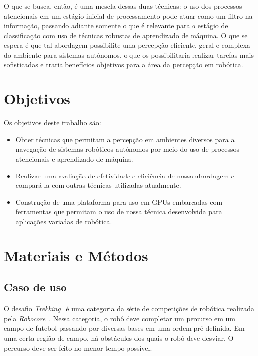 \documentclass[8pt]{article}
\newcommand{\tit}[1]{\textit{#1}}
\begin{document}
\begin{multicols}{2}
O que se busca, então, é uma mescla dessas duas técnicas: o uso dos processos
atencionais em um estágio inicial de processamento pode atuar como um filtro
na informação, passando adiante somente o que é relevante para o estágio de
classificação com uso de técnicas robustas de aprendizado de máquina. 
O que se espera é que tal abordagem possibilite uma percepção eficiente, geral
e complexa do ambiente para sistemas autônomos, o que os possibilitaria 
realizar tarefas mais sofisticadas e traria benefícios objetivos para
a área da percepção em robótica.

\section{Objetivos}
\paragraph{}
Os objetivos deste trabalho são:
\begin{itemize}
	\item Obter técnicas que permitam a percepção em ambientes
		diversos para a navegação de sistemas robóticos autônomos por meio 
		do uso de processos atencionais e aprendizado de máquina.
	\item Realizar uma avaliação de efetividade e eficiência de nossa abordagem
		e compará-la com outras técnicas utilizadas atualmente.
	\item Construção de uma plataforma para uso em GPUs embarcadas com 
		ferramentas que permitam o uso de nossa técnica desenvolvida para
		aplicações variadas de robótica.
\end{itemize}

\section{Materiais e Métodos}
\subsection{Caso de uso}
\paragraph{}
O desafio \tit{Trekking}~\cite{trekking_regras} é uma categoria da série de 
competições de robótica realizada pela \tit{Robocore}~\cite{robocore}. 
Nessa categoria, o robô deve completar um percurso em 
um campo de futebol passando por diversas bases em uma ordem pré-definida.
Em uma certa região do campo, há obstáculos dos quais o robô deve desviar.
O percurso deve ser feito no menor tempo possível.


\end{multicols}
\end{document}
